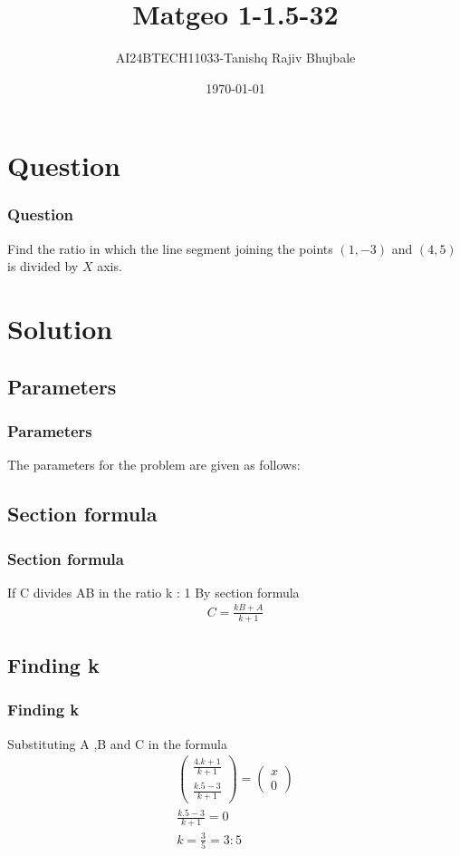 \documentclass{beamer}
\title{Matgeo 1-1.5-32}
\author{AI24BTECH11033-Tanishq Rajiv Bhujbale}
\date{\today}
\providecommand{\brak}[1]{\ensuremath{\left(#1\right)}}
\theoremstyle{remark}
\newcommand{\myvec}[1]{\ensuremath{\begin{pmatrix}#1\end{pmatrix}}}
\numberwithin{equation}{section}
\begin{document}
\begin{frame}
\titlepage
\end{frame}


\section{Question}
\begin{frame}
\frametitle{Question}

Find the ratio in which the line segment joining the points $\brak{1,-3}$ and $\brak{4, 5}$ is divided by $X$ axis.
\\
\end{frame}

\section{Solution}
\subsection{Parameters}
\begin{frame}
\frametitle{Parameters}
The parameters for the problem are given as follows:
\begin{table}[h]
    \centering
    
\end{table}
\end{frame}

\subsection{Section formula}
\begin{frame}
\frametitle{Section formula}
If C divides AB in the ratio k : 1
By section formula
\begin{align*}
C=\frac{kB+A}{k+1}
\end{align*}
\end{frame}

\subsection{Finding k}
\begin{frame}
\frametitle{Finding k}
Substituting A ,B and C in the formula 
	\begin{align*}
	\myvec{ \frac{4.k+1}{k+1}\\ \frac{k.5-3}{k+1}} = \myvec{ x \\ 0} \\	 
 \frac{k.5-3}{k+1} = 0 \\
 k=\frac{3}{5}=3:5 
\end{align*}
\end{frame}
\end{document}
